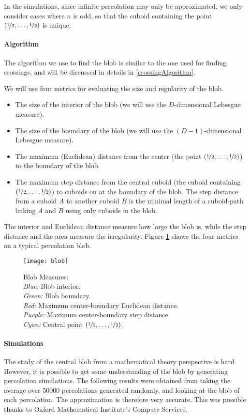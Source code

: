 In the simulations, since infinite percolation may only be approximated, we only consider cases where $n$ is odd, so that the cuboid containing the point $(\nicefrac{1}{2}, \dots, \nicefrac{1}{2})$ is unique.

\paragraph{Algorithm}
The algorithm we use to find the blob is similar to the one used for finding crossings, and will be discussed in details in \ref{crossingAlgorithm}.

We will use four metrics for evaluating the size and regularity of the blob.
\begin{itemize}
	\item The size of the interior of the blob (we will use the $D$-dimensional Lebesgue measure).
	\item The size of the boundary of the blob (we will use the $(D-1)$-dimensional Lebesgue measure).
	\item The maximum (Euclidean) distance from the center (the point $(\nicefrac{1}{2},\dots,\nicefrac{1}{2})$) to the boundary of the blob.
	\item The maximum step distance from the central cuboid (the cuboid containing $(\nicefrac{1}{2},\dots,\nicefrac{1}{2})$) to cuboids on at the boundary of the blob. The step distance from a cuboid $A$ to another cuboid $B$ is the minimal length of a cuboid-path linking $A$ and $B$ using only cuboids in the blob.
\end{itemize}
The interior and Euclidean distance measure how large the blob is, while the step distance and the area measure the irregularity.
Figure \ref{fig:blobMeasures} shows the four metrics on a typical percolation blob.

\begin{figure}[!h]
	\centering
	\texttt{[image: blob]}
	\caption{Blob Measures:\\
		\textit{Blue:} Blob interior.\\
		\textit{Green:} Blob boundary.\\
		\textit{Red:} Maximum center-boundary Euclidean distance.\\
		\textit{Purple:} Maximum center-boundary step distance.\\
		\textit{Cyan:} Central point $(\nicefrac{1}{2},\dots,\nicefrac{1}{2})$.}
	\label{fig:blobMeasures}
\end{figure}

\paragraph{Simulations}
The study of the central blob from a mathematical theory perspective is hard.
However, it is possible to get some understanding of the blob by generating percolation simulations.
The following results were obtained from taking the average over 50000 percolations generated randomly, and looking at the blob of each percolation.
The approximation is therefore very accurate.
This was possible thanks to Oxford Mathematical Institute's Compute Services.

